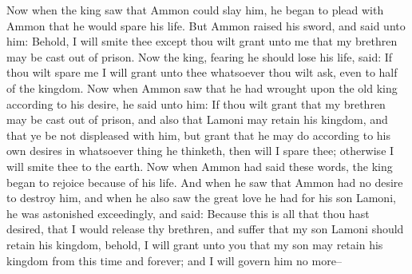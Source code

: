 Now when the king saw that Ammon could slay him, he began to plead with Ammon that he would spare his life.
\bverse \iffalse But Ammon raised his sword, and said unto him: Behold, I will smite thee except thou wilt grant unto me that my brethren may be cast out of prison. \fi
But Ammon raised his sword, and said unto him: Behold, I will smite thee except thou wilt grant unto me that my brethren may be cast out of prison.
\bverse \iffalse Now the king, fearing he should lose his life, said: If thou wilt spare me I will grant unto thee whatsoever thou wilt ask, even to half of the kingdom. \fi
Now the king, fearing he should lose his life, said: If thou wilt spare me I will grant unto thee whatsoever thou wilt ask, even to half of the kingdom.
\bverse \iffalse Now when Ammon saw that he had wrought upon the old king according to his desire, he said unto him: If thou wilt grant that my brethren may be cast out of prison, and also that Lamoni may retain his kingdom, and that ye be not displeased with him, but grant that he may do according to his own desires in whatsoever thing he thinketh, then will I spare thee; otherwise I will smite thee to the earth. \fi
Now when Ammon saw that he had wrought upon the old king according to his desire, he said unto him: If thou wilt grant that my brethren may be cast out of prison, and also that Lamoni may retain his kingdom, and that ye be not displeased with him, but grant that he may do according to his own desires in whatsoever thing he thinketh, then will I spare thee; otherwise I will smite thee to the earth.
\bverse \iffalse Now when Ammon had said these words, the king began to rejoice because of his life. \fi
Now when Ammon had said these words, the king began to rejoice because of his life.
\bverse \iffalse And when he saw that Ammon had no desire to destroy him, and when he also saw the great love he had for his son Lamoni, he was astonished exceedingly, and said: Because this is all that thou hast desired, that I would release thy brethren, and suffer that my son Lamoni should retain his kingdom, behold, I will grant unto you that my son may retain his kingdom from this time and forever; and I will govern him no more-- \fi
And when he saw that Ammon had no desire to destroy him, and when he also saw the great love he had for his son Lamoni, he was astonished exceedingly, and said: Because this is all that thou hast desired, that I would release thy brethren, and suffer that my son Lamoni should retain his kingdom, behold, I will grant unto you that my son may retain his kingdom from this time and forever; and I will govern him no more--
